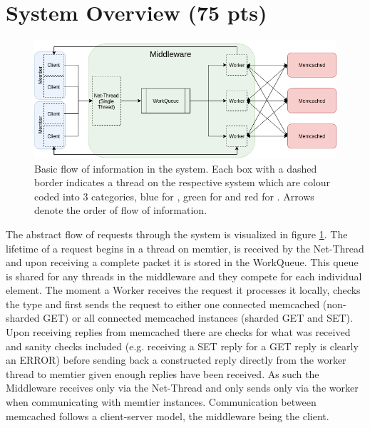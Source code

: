 \section{System Overview (75 pts)\label{sec:1}}

    \begin{figure}
        \includegraphics[width=0.8\linewidth]{graphics/system-request-flow.png}
        \caption{Basic flow of information in the system. Each box with a dashed border indicates a thread on the
                 respective system which are colour coded into 3 categories, blue for \cli, green for \mw{} and red for
                 \srv. Arrows denote the order of flow of information.\label{fig:request-overview}}
    \end{figure}

    The abstract flow of requests through the system is visualized in figure \ref{fig:request-overview}. The lifetime
    of a request begins in a thread on memtier, is received by the Net-Thread and upon receiving a complete packet
    it is stored in the WorkQueue. This queue is shared for any threads in the middleware and they compete for each
    individual element. The moment a Worker receives the request it processes it locally, checks the type and first
    sends the request to either one connected memcached (non-sharded GET) or all connected memcached instances
    (sharded GET and SET). Upon receiving replies from memcached there are checks for what was received and sanity
    checks included (e.g. receiving a SET reply for a GET reply is clearly an ERROR) before sending back a constructed
    reply directly from the worker thread to memtier given enough replies have been received. As such the Middleware
    receives only via the Net-Thread and only sends only via the worker when communicating with memtier instances.
    Communication between memcached follows a client-server model, the middleware being the client.

